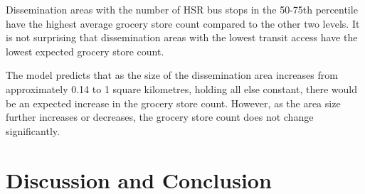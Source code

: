 \documentclass[preprint, 3p,
authoryear]{elsarticle} %
\begin{document}
Dissemination areas with the number of HSR bus stops in the 50-75th
percentile have the highest average grocery store count compared to the
other two levels. It is not surprising that dissemination areas with the
lowest transit access have the lowest expected grocery store count.

The model predicts that as the size of the dissemination area increases
from approximately 0.14 to 1 square kilometres, holding all else
constant, there would be an expected increase in the grocery store
count. However, as the area size further increases or decreases, the
grocery store count does not change significantly.

\section{Discussion and Conclusion}\label{discussion-and-conclusion}

\renewcommand\refname{References}

\end{document}
